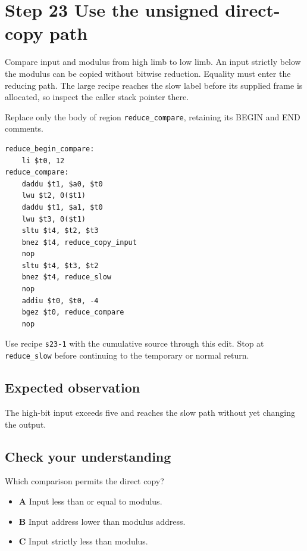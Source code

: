 \section{Step 23 Use the unsigned direct-copy path}\label{rsa-s23}

Compare input and modulus from high limb to low limb. An input strictly below the modulus can be copied without bitwise reduction. Equality must enter the reducing path. The large recipe reaches the slow label before its supplied frame is allocated, so inspect the caller stack pointer there.

Replace only the body of region \texttt{reduce\_compare}, retaining its BEGIN and END comments.

\begin{verbatim}
reduce_begin_compare:
    li $t0, 12
reduce_compare:
    daddu $t1, $a0, $t0
    lwu $t2, 0($t1)
    daddu $t1, $a1, $t0
    lwu $t3, 0($t1)
    sltu $t4, $t2, $t3
    bnez $t4, reduce_copy_input
    nop
    sltu $t4, $t3, $t2
    bnez $t4, reduce_slow
    nop
    addiu $t0, $t0, -4
    bgez $t0, reduce_compare
    nop
\end{verbatim}

Use recipe \texttt{s23-1} with the cumulative source through this edit. Stop at \texttt{reduce\_slow} before continuing to the temporary or normal return.

\subsection{Expected observation}
The high-bit input exceeds five and reaches the slow path without yet changing the output.

\subsection{Check your understanding}
Which comparison permits the direct copy?

\begin{itemize}
  \item \textbf{A} Input less than or equal to modulus.
  \item \textbf{B} Input address lower than modulus address.
  \item \textbf{C} Input strictly less than modulus.
\end{itemize}
